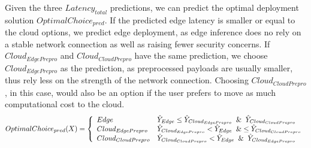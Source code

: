 Given the three $Latency_{total}$ predictions, we can predict the optimal deployment solution $OptimalChoice_{pred}$.
If the predicted edge latency is smaller or equal to the cloud options, we predict edge deployment, as edge inference does no rely on a stable network connection as well as raising fewer security concerns.
If $Cloud_{EdgePrepro}$ and $Cloud_{CloudPrepro}$ have the same prediction, we choose $Cloud_{EdgePrepro}$ as the prediction, as preprocessed payloads are usually smaller, thus rely less on the strength of the network connection. Choosing $Cloud_{CloudPrepro}$, in this case, would also be an option if the user prefers to move as much computational cost to the cloud.
\begin{equation*}
\begin{gathered}
OptimalChoice_{pred}(X) = \left\{\begin{array}{ll}
Edge  & \hat{Y}_{Edge} \leq \hat{Y}_{Cloud_{EdgePrepro}} \And \hat{Y}_{Cloud_{CloudPrepro}}\\
Cloud_{EdgePrepro}  &\hat{Y}_{Cloud_{EdgePrepro}} <   \hat{Y}_{Edge} \And \leq \hat{Y}_{Cloud_{CloudPrepro}}\\
Cloud_{CloudPrepro} & \hat{Y}_{Cloud_{CloudPrepro}} < \hat{Y}_{Edge} \And \hat{Y}_{Cloud_{EdgePrepro}}
\end{array}\right.
\end{gathered}
\end{equation*}

